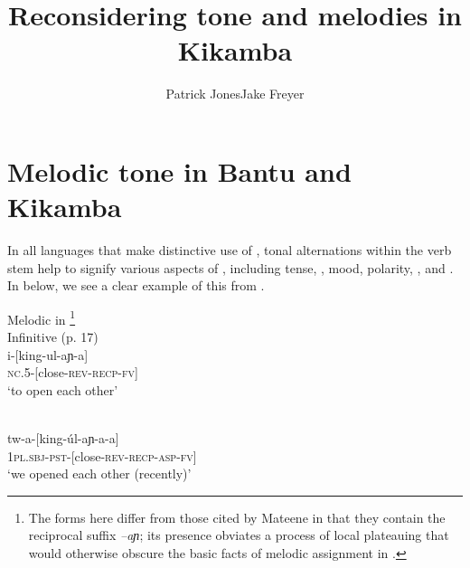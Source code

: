 \documentclass[output=paper
,newtxmath
,modfonts
,nonflat]{langsci/langscibook}
\title{Reconsidering tone and melodies in Kikamba}
\author{Patrick Jones\affiliation{Georgetown University}\lastand Jake Freyer\affiliation{Brandeis University}}
\begin{document}
\maketitle

\section{Melodic tone in Bantu and Kikamba}\label{sec:jones:1}

In all  languages that make distinctive use of , tonal alternations within the verb stem help to signify various aspects of , including tense, , mood, polarity, , and  \citep{Bickmore2014}. In  below, we see a clear example of this from  \citep{Mateene1992}.



\ea\label{ex:jones:1}
\label{bkm:Ref359185255}Melodic  in  \citep{Mateene1992}\footnote{The forms here differ from those cited by Mateene in that they contain the reciprocal suffix \textit{–aɲ}; its presence obviates a process of local  plateauing that would otherwise obscure the basic facts of melodic  assignment in .}\\
\ea\label{ex:jones:1a}
\label{bkm:Ref359185416}Infinitive (p. 17)\\
\gll   i-[king-ul-aɲ-a]\\
       \textsc{nc}.5-[close-\textsc{rev}-\textsc{recp}-\textsc{fv}]\footnotemark\\
\glt   ‘to open each other’  


\ex\label{ex:jones:1b}
\\
\gll   tw-a-[king-úl-aɲ-a-a]    \\
       \textsc{1pl.sbj}-\textsc{pst}-[close-\textsc{rev}-\textsc{recp}-\textsc{asp}-\textsc{fv}]\\
\glt ‘we opened each other (recently)’
\end{document}
